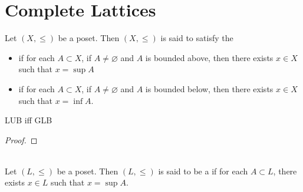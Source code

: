 \documentclass{book}
\begin{document}
	
	
	
	
	
	
	
	
	
	
	
	
	
	
	
	
	\newpage
	\section{Complete Lattices}
	
	\begin{defn} 
		Let $(X, \leq)$ be a poset. Then $(X, \leq)$ is said to satisfy the 
		\begin{itemize}
			\item {} if for each $A \subset X$, if $A \neq \varnothing$ and $A$ is bounded above, then there exists $x \in X$ such that $x = \sup A$
			\item {} if for each $A \subset X$, if $A \neq \varnothing$ and $A$ is bounded below, then there exists $x \in X$ such that $x = \inf A$. 
		\end{itemize}
	\end{defn}
	
	\begin{ex}
		LUB iff GLB
	\end{ex}
	
	\begin{proof}
		\tcr{FINISH!!!!}
	\end{proof}
	
	\begin{defn}  \\
		Let $(L, \leq)$ be a poset. Then $(L, \leq)$ is said to be a  if for each $A \subset L$, there exists $x \in L$ such that $x = \sup A$. 
	\end{defn}
	
	
	
	
	
	
	
	
	
	
	
	
	
	
	
	
	
	
	
	
	
	
	
	
	
	
	
\end{document}

